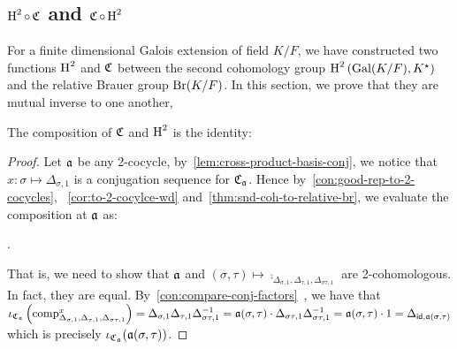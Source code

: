 \subsection{$\operatorname{H}^{2} \circ \operatorname{\mathfrak{C}}$ and $\operatorname{\mathfrak{C}} \circ \operatorname{H}^{2}$}

For a finite dimensional Galois extension of field $K/F$, we have constructed two functions $\operatorname{H}^{2}$ and $\operatorname{\mathfrak{C}}$ between the second cohomology group $\operatorname{H}^{2}\left(\operatorname{Gal}(K/F), K^{\star}\right)$ and the relative Brauer group $\operatorname{Br}(K/F)$. In this section, we prove that they are mutual inverse to one another,

\begin{lemma}\label{lem:relative-br-snd-inverse-1}
  The composition of $\operatorname{\mathfrak{C}}$ and $\operatorname{H}^{2}$ is the identity:
  \begin{center}
  \end{center}
  \leanok
\end{lemma}
\begin{proof}
  Let $\mathfrak{a}$ be any 2-cocycle, by~\cref{lem:cross-product-basis-conj}, we notice that $x : \sigma \mapsto \Delta_{\sigma, 1}$ is a conjugation sequence for $\operatorname{\mathfrak{C}}_{\mathfrak{a}}$. Hence by~\cref{con:good-rep-to-2-cocycles}, ~\cref{cor:to-2-cocylce-wd} and~\cref{thm:snd-coh-to-relative-br}, we evaluate the composition at $\mathfrak{a}$ as:
  \begin{center}
    .
  \end{center}
  That is, we need to show that $\mathfrak{a}$ and $(\sigma, \tau) \mapsto \comp_{\Delta_{\sigma, 1}, \Delta_{\tau, 1}, \Delta_{\sigma\tau, 1}}$ are 2-cohomologous. In fact, they are equal.
  By~\cref{con:compare-conj-factors}~, we have that $\iota_{\operatorname{\mathfrak{C}}_{\mathfrak{a}}}\left(\operatorname{comp}^{x}_{\Delta_{\sigma, 1}, \Delta_{\tau, 1}, \Delta_{\sigma\tau, 1}}\right) = \Delta_{\sigma, 1}\Delta_{\tau, 1}\Delta_{\sigma\tau, 1}^{-1} = \mathfrak{a}(\sigma,\tau)\cdot \Delta_{\sigma\tau, 1}\Delta_{\sigma\tau, 1}^{-1} = \mathfrak{a}(\sigma,\tau)\cdot 1 = \Delta_{\mathsf{id},\mathfrak{a}(\sigma,\tau)}$ which is precisely $\iota_{\operatorname{\mathfrak{C}}_{\mathfrak{a}}}(\mathfrak{a}(\sigma,\tau))$.
\end{proof}

